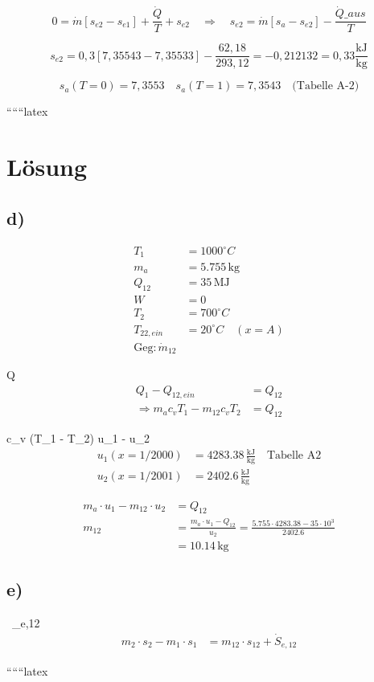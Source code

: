 \[
0 = \dot{m} \left[ s_{e2} - s_{e1} \right] + \frac{\dot{Q}}{T} + s_{e2} \quad \Rightarrow \quad s_{e2} = \dot{m} \left[ s_{a} - s_{e2} \right] - \frac{\dot{Q}\_aus}{T}
\]

\[
s_{e2} = 0,3 \left[ 7,35543 - 7,35533 \right] - \frac{62,18}{293,12} = -0,212132 = 0,33 \frac{\text{kJ}}{\text{kg}}
\]

\[
s_{a}(T=0) = 7,3553 \quad s_{a}(T=1) = 7,3543 \quad \text{(Tabelle A-2)}
\]

``````latex


\section*{Lösung}

\subsection*{d)}
\begin{align*}
    T_1 &= 1000^\circ C \\
    m_a &= 5.755 \, \text{kg} \\
    Q_{12} &= 35 \, \text{MJ} \\
    W &= 0 \\
    T_2 &= 700^\circ C \\
    T_{22,ein} &= 20^\circ C \quad (x = A) \\
    \text{Geg:} \, \dot{m}_{12}
\end{align*}

 Q
\begin{align*}
    Q_1 - Q_{12,ein} &= Q_{12} \\
    \Rightarrow m_a c_v T_1 - m_{12} c_v T_2 &= Q_{12}
\end{align*}

 c_v (T_1 - T_2)  \Rightarrow u_1 - u_2
\begin{align*}
    u_1 (x = 1/2000) &= 4283.38 \, \frac{\text{kJ}}{\text{kg}} \quad \text{Tabelle A2} \\
    u_2 (x = 1/2001) &= 2402.6 \, \frac{\text{kJ}}{\text{kg}}
\end{align*}

\begin{align*}
    m_a \cdot u_1 - m_{12} \cdot u_2 &= Q_{12} \\
    m_{12} &= \frac{m_a \cdot u_1 - Q_{12}}{u_2} = \frac{5.755 \cdot 4283.38 - 35 \cdot 10^3}{2402.6} \\
    &= 10.14 \, \text{kg}
\end{align*}

\subsection*{e)}
 \, _{e,12}
\begin{align*}
    m_2 \cdot s_2 - m_1 \cdot s_1 &= m_{12} \cdot s_{12} + \dot{S}_{e,12}
\end{align*}

``````latex


